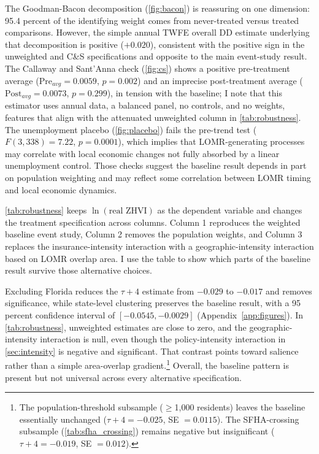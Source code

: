 \documentclass[12pt]{article}
\begin{document}
The Goodman-Bacon decomposition (\autoref{fig:bacon}) is reassuring on one dimension: 95.4 percent of the identifying weight comes from never-treated versus treated comparisons. However, the simple annual TWFE overall DD estimate underlying that decomposition is positive ($+0.020$), consistent with the positive sign in the unweighted and C\&S specifications and opposite to the main event-study result. The Callaway and Sant'Anna check (\autoref{fig:cs}) shows a positive pre-treatment average ($\text{Pre}_{avg} = 0.0059$, $p = 0.002$) and an imprecise post-treatment average ($\text{Post}_{avg} = 0.0073$, $p = 0.299$), in tension with the baseline; I note that this estimator uses annual data, a balanced panel, no controls, and no weights, features that align with the attenuated unweighted column in \autoref{tab:robustness}. The unemployment placebo (\autoref{fig:placebo}) fails the pre-trend test ($F(3,338) = 7.22$, $p = 0.0001$), which implies that LOMR-generating processes may correlate with local economic changes not fully absorbed by a linear unemployment control. Those checks suggest the baseline result depends in part on population weighting and may reflect some correlation between LOMR timing and local economic dynamics.

\autoref{tab:robustness} keeps $\ln(\text{real ZHVI})$ as the dependent variable and changes the treatment specification across columns. Column 1 reproduces the weighted baseline event study, Column 2 removes the population weights, and Column 3 replaces the insurance-intensity interaction with a geographic-intensity interaction based on LOMR overlap area. I use the table to show which parts of the baseline result survive those alternative choices.



Excluding Florida reduces the $\tau{+}4$ estimate from $-0.029$ to $-0.017$ and removes significance, while state-level clustering preserves the baseline result, with a 95 percent confidence interval of $[-0.0545, -0.0029]$ (Appendix~\ref{app:figures}). In \autoref{tab:robustness}, unweighted estimates are close to zero, and the geographic-intensity interaction is null, even though the policy-intensity interaction in \autoref{sec:intensity} is negative and significant. That contrast points toward salience rather than a simple area-overlap gradient.\footnote{The population-threshold subsample ($\geq$1,000 residents) leaves the baseline essentially unchanged ($\tau{+}4 = -0.025$, SE $= 0.0115$). The SFHA-crossing subsample (\autoref{tab:sfha_crossing}) remains negative but insignificant ($\tau{+}4 = -0.019$, SE $= 0.012$).} Overall, the baseline pattern is present but not universal across every alternative specification.
\end{document}
